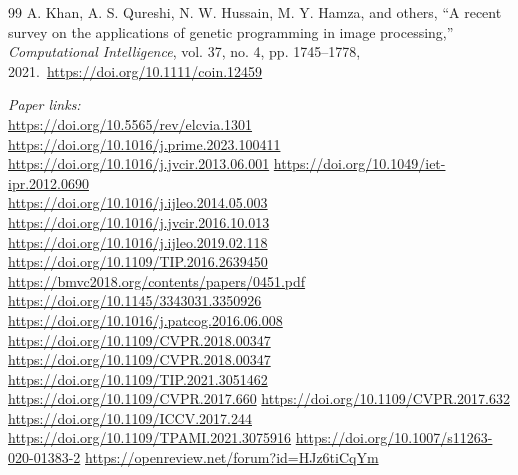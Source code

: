 \documentclass[11pt,a4paper]{article}
\begin{document}
\begin{thebibliography}{99}
A. Khan, A. S. Qureshi, N. W. Hussain, M. Y. Hamza, and others, ``A recent survey on the applications of genetic programming in image processing,'' \emph{Computational Intelligence}, vol. 37, no. 4, pp. 1745--1778, 2021.\
\url{https://doi.org/10.1111/coin.12459}

\noindent\textit{Paper links:}\\
\url{https://doi.org/10.5565/rev/elcvia.1301} \quad
\url{https://doi.org/10.1016/j.prime.2023.100411} \quad
\url{https://doi.org/10.1016/j.jvcir.2013.06.001} \quad
\url{https://doi.org/10.1049/iet-ipr.2012.0690}\\
\url{https://doi.org/10.1016/j.ijleo.2014.05.003} \quad
\url{https://doi.org/10.1016/j.jvcir.2016.10.013} \quad
\url{https://doi.org/10.1016/j.ijleo.2019.02.118} \quad
\url{https://doi.org/10.1109/TIP.2016.2639450}\\
\url{https://bmvc2018.org/contents/papers/0451.pdf} \quad
\url{https://doi.org/10.1145/3343031.3350926} \quad
\url{https://doi.org/10.1016/j.patcog.2016.06.008} \quad
\url{https://doi.org/10.1109/CVPR.2018.00347}\\
\url{https://doi.org/10.1109/CVPR.2018.00347} \quad
\url{https://doi.org/10.1109/TIP.2021.3051462} \quad
\url{https://doi.org/10.1109/CVPR.2017.660} \quad
\url{https://doi.org/10.1109/CVPR.2017.632}\\
\url{https://doi.org/10.1109/ICCV.2017.244} \quad
\url{https://doi.org/10.1109/TPAMI.2021.3075916} \quad
\url{https://doi.org/10.1007/s11263-020-01383-2} \quad
\url{https://openreview.net/forum?id=HJz6tiCqYm}

\end{thebibliography}
\end{document}
